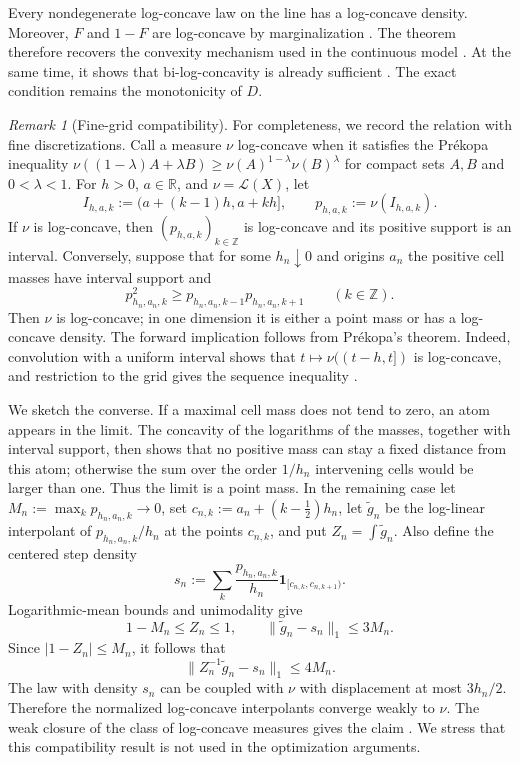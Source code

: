 \documentclass[a4paper]{amsart}
\numberwithin{equation}{section}
\theoremstyle{remark}
\newtheorem{remark}[theorem]{Remark}
\newcommand{\R}{\mathbb R}
\newcommand{\1}{\mathbf 1}
\begin{document}
Every nondegenerate log-concave law on the line has a log-concave density.
Moreover, $F$ and $1-F$ are log-concave by marginalization
\cite{prekopa1973,bagnoli-bergstrom,saumard-wellner}.  The theorem therefore
recovers the convexity mechanism used in the continuous model
\cite{nistor-popescu-continuous}.  At the same time, it shows that
bi-log-concavity is already sufficient \cite{duembgen-kolesnyk-wilke}.  The
exact condition remains the monotonicity of $D$.

\begin{remark}[Fine-grid compatibility]
\label{rem:fine-grid-compatibility}
For completeness, we record the relation with fine discretizations.  Call a
measure $\nu$ log-concave when it satisfies the Pr\'ekopa inequality
$\nu((1-\lambda)A+\lambda B)\geq
\nu(A)^{1-\lambda}\nu(B)^\lambda$ for compact sets $A,B$ and
$0<\lambda<1$.  For $h>0$, $a\in\R$, and $\nu=\mathcal L(X)$, let
\[
 I_{h,a,k}:=(a+(k-1)h,a+kh],\qquad
 p_{h,a,k}:=\nu(I_{h,a,k}).
\]
If $\nu$ is log-concave, then $(p_{h,a,k})_{k\in\mathbb Z}$ is log-concave
and its positive support is an interval.  Conversely, suppose that for some
$h_n\downarrow0$ and origins $a_n$ the positive cell masses have interval
support and
\[
 p_{h_n,a_n,k}^{2}\geq
 p_{h_n,a_n,k-1}p_{h_n,a_n,k+1}
 \qquad(k\in\mathbb Z).
\]
Then $\nu$ is log-concave; in one dimension it is either a point mass or has a
log-concave density.  The forward implication follows from Pr\'ekopa's theorem.
Indeed, convolution with a uniform
interval shows that $t\mapsto\nu((t-h,t])$ is log-concave, and restriction to
the grid gives the sequence inequality \cite{prekopa1973}.

We sketch the converse.  If a maximal cell mass does not tend to zero, an atom
appears in the limit.  The concavity of the logarithms of the masses, together
with interval support, then shows that no positive mass can stay a fixed
distance from this atom; otherwise the sum over the order $1/h_n$ intervening
cells would be larger than one.  Thus the limit is a point mass.  In the
remaining case let $M_n:=\max_k p_{h_n,a_n,k}\to0$, set
$c_{n,k}:=a_n+(k-\tfrac12)h_n$, let $\widetilde g_n$ be the log-linear
interpolant of $p_{h_n,a_n,k}/h_n$ at the points $c_{n,k}$, and put
$Z_n=\int\widetilde g_n$.  Also define the centered step density
\[
 s_n:=\sum_k\frac{p_{h_n,a_n,k}}{h_n}
       \1_{[c_{n,k},c_{n,k+1})}.
\]
Logarithmic-mean bounds and unimodality give
\[
 1-M_n\leq Z_n\leq1,
 \qquad \|\widetilde g_n-s_n\|_1\leq3M_n.
\]
Since $|1-Z_n|\leq M_n$, it follows that
\[
 \|Z_n^{-1}\widetilde g_n-s_n\|_1\leq4M_n.
\]
The law with density $s_n$ can be coupled with $\nu$ with displacement at most
$3h_n/2$.  Therefore the normalized log-concave interpolants converge weakly
to $\nu$.  The weak closure of the class of log-concave measures gives the
claim \cite{saumard-wellner}.  We stress that this compatibility result is not
used in the optimization arguments.
\end{remark}
\end{document}
